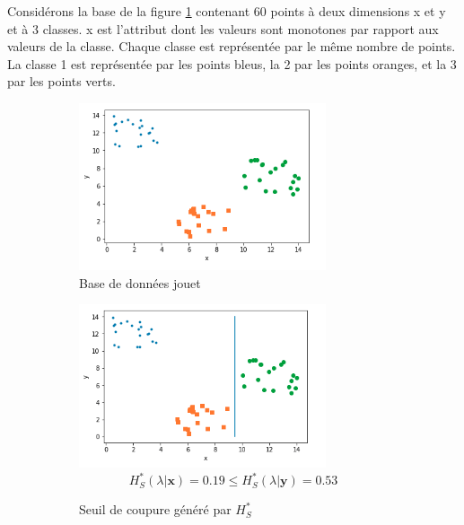 \documentclass[a4paper]{article}
\begin{document}
Considérons la base de la figure \ref{img:artificial-dataset} contenant 60
points à deux dimensions x et y et à 3 classes. x est l'attribut dont les valeurs sont
monotones par rapport aux valeurs de la classe. Chaque classe est représentée
par le même nombre de points. La classe 1 est
représentée par les points bleus, la 2 par les points oranges, et la 3 par les
points verts. 

\begin{figure}[H]
	\centering
    \begin{subfigure}[c]{0.46\textwidth}
        \centering
	    \includegraphics[width=0.8\textwidth]{images/artificial-dataset.png}
        \caption{Base de données jouet}
        \label{img:artificial-dataset}
    \end{subfigure}
    \vfill
    \begin{subfigure}[c]{0.46\textwidth}
        \centering
	    \includegraphics[width=0.8\textwidth]{images/threshold_rsdm.png}
    $$H^*_S(\lambda | \mathbf{x}) =  0.19 \leq H^*_S(\lambda | \mathbf{y}) =  0.53$$
        \caption{Seuil de coupure généré par $H^*_S$}
        \label{img:threshold_rsdm}
    \end{subfigure}
    \begin{subfigure}[c]{0.46\textwidth}

\end{subfigure}
\end{figure}
\end{document}
